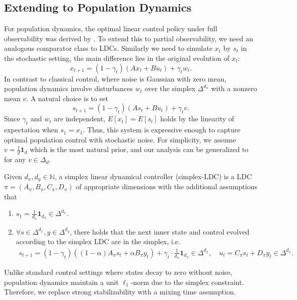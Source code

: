 \subsection{Extending to Population Dynamics}
For population dynamics, the optimal linear control policy under full observability was derived by \cite{golowich2024online}. To extend this to partial observability, we need an analogous comparator class to LDCs. Similarly we need to simulate $x_t$ by $s_t$ in the stochastic setting, the main difference lies in the original evolution of $x_t$:
$$
x_{t+1}=(1-\gamma_t)(Ax_t+Bu_t)+\gamma_t w_t.
$$
In contrast to classical control, where noise is Gaussian with zero mean, population dynamics involve disturbances $w_t$ over the simplex $\Delta^{d_x}$ with a nonzero mean $v$. A natural choice is to set
$$
s_{t+1}=(1-\gamma_t)(As_t+Bu_t)+\gamma_t v.
$$
Since $\gamma_t$ and $w_t$ are independent, $E[x_t]=E[s_t]$ holds by the linearity of expectation when $s_1=x_1$. Thus, this system is expressive enough to capture optimal population control with stochastic noise. For simplicity, we assume $v=\frac{1}{d} \mathbf{1}_d$ which is the most natural prior, and our analysis can be generalized to for any $v\in \Delta_d$.

\begin{definition}
\label{def:po-comparator-ldc}
Given $d_x, d_y\in\mathbb{N}$, a simplex linear dynamical controller (simplex-LDC) is a LDC $\pi=(A_{\pi}, B_{\pi}, C_{\pi}, D_{\pi})$ of appropriate dimensions with the additional assumptions that
\begin{enumerate}
\item $s_1=\frac{1}{d_x}\mathbf{1}_{d_x}\in\Delta^{d_x}$.
\item $\forall s\in\Delta^{d_x}, y\in\Delta^{d_y}$, there holds that the next inner state and control evolved according to the simplex LDC are in the simplex, i.e.
\begin{align*}
s_{t+1}=(1-\gamma_t)((1-\alpha)A_{\pi}s_t+\alpha B_{\pi}y_t)+\gamma_t\cdot\frac{1}{d_x}\mathbf{1}_{d_x}\in\Delta^{d_x}, \quad u_t=C_{\pi}s_t+D_{\pi}y_t\in\Delta^{d_x}. 
\end{align*} 
\end{enumerate}
\end{definition}

Unlike standard control settings where states decay to zero without noise, population dynamics maintain a unit $\ell_1$-norm due to the simplex constraint. Therefore, we replace strong stabilizability with a mixing time assumption.

